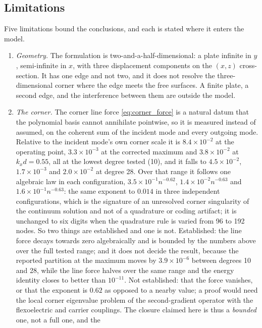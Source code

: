 \subsection{Limitations}
\label{sec:disc_limitations}

Five limitations bound the conclusions, and each is stated where it enters the
model.

\begin{enumerate}
\item \emph{Geometry.}  The formulation is two-and-a-half-dimensional: a plate
infinite in $y$, semi-infinite in $x$, with three displacement components on the
$(x,z)$ cross-section.  It has one edge and not two, and it does not resolve the
three-dimensional corner where the edge meets the free surfaces.  A finite
plate, a second edge, and the interference between them are outside the model.
\item \emph{The corner.}  The corner line force \eqref{eq:corner_force} is a
natural datum that the polynomial basis cannot annihilate pointwise, so it is
measured instead of assumed, on the coherent sum of the incident mode and every
outgoing mode.  Relative to the incident mode's own corner scale it is
$8.4\times10^{-2}$ at the operating point, $3.3\times10^{-3}$ at the corrected
maximum and $3.8\times10^{-2}$ at $k_xd=0.55$, all at the lowest degree tested
(10), and it falls to $4.5\times10^{-2}$, $1.7\times10^{-3}$ and
$2.0\times10^{-2}$ at degree 28.  Over that range it follows one algebraic law in
each configuration, $3.5\times10^{-1}n^{-0.62}$,
$1.4\times10^{-2}n^{-0.63}$ and $1.6\times10^{-1}n^{-0.63}$: the same exponent to
$0.014$ in three independent configurations, which is the signature of an unresolved corner singularity of the continuum solution and not of a quadrature or coding artifact; it is unchanged to six digits when the quadrature rule is varied from 96 to 192 nodes.  So two things are established and one is not.  Established: the line force decays towards zero
algebraically and is bounded by the numbers above over the full tested range;
and it does not decide the result, because the reported partition at the maximum moves
by $3.9\times10^{-6}$ between degrees 10 and 28, while the line force halves over the same range and the energy identity closes to better than $10^{-11}$.  Not
established: that the force vanishes, or that the exponent is $0.62$ as opposed
to a nearby value; a proof would need the local corner eigenvalue problem of the
second-gradient operator with the flexoelectric and carrier couplings.  The closure claimed here is thus a \emph{bounded} one, not a full one, and the

\end{enumerate}
